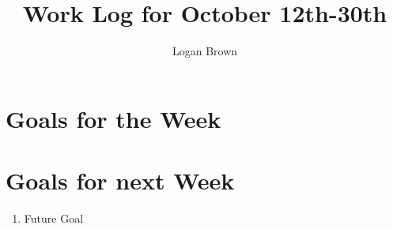 

\title{Work Log for October 12th-30th}
\author{Logan Brown}


\maketitle


\section{Goals for the Week}



\section{Goals for next Week}
\begin{enumerate}
\item Future Goal
\end{enumerate}


